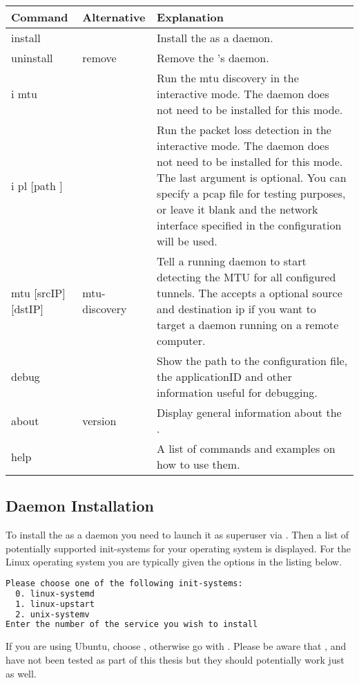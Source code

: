 \begin{tabularx}{\textwidth}{l|l|>{\raggedright\arraybackslash}X} 
\textbf{Command} & \textbf{Alternative} & \textbf{Explanation} \\
\hline
install &  & Install the \entool{} as a daemon.\\
uninstall & remove & Remove the \entool{}'s daemon.\\
i mtu &  & Run the mtu discovery in the interactive mode. The daemon does not need to be installed for this mode.\\
i pl [path ]&  & Run the packet loss detection in the interactive mode. The daemon does not need to be installed for this mode. The last argument is optional. You can specify a pcap file for testing purposes, or leave it blank and the network interface specified in the configuration will be used.\\
mtu [srcIP] [dstIP] & mtu-discovery & Tell a running daemon to start detecting the MTU for all configured tunnels. The \entool{} accepts a optional source and destination ip if you want to target a daemon running on a remote computer. \\
debug &  & Show the path to the configuration file, the applicationID and other information useful for debugging.\\
about & version & Display general information about the \entool{}. \\
help & & A list of commands and examples on how to use them.
\end{tabularx}

\subsection{Daemon Installation}
To install the \entool{} as a daemon you need to launch it as superuser via . Then a list of potentially supported init-systems for your operating system is displayed. For the Linux operating system you are typically given the options in the listing below.

\begin{lstlisting}[language=bash, caption=Supported linux init-systems]
Please choose one of the following init-systems:
  0. linux-systemd
  1. linux-upstart
  2. unix-systemv
Enter the number of the service you wish to install
\end{lstlisting}

If you are using Ubuntu, choose , otherwise go with . Please be aware that , and  have not been tested as part of this thesis but they should potentially work just as well.


